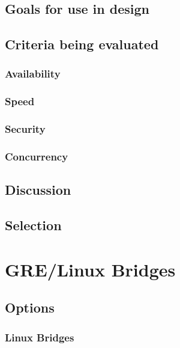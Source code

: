 \documentclass[10pt,letterpaper,onecolumn,draftclsnofoot]{IEEEtran}
\begin{document}
\subsection{Goals for use in design}

\subsection{Criteria being evaluated}

\subsubsection{Availability}

\subsubsection{Speed}

\subsubsection{Security}

\subsubsection{Concurrency}

\subsection{Discussion}


\subsection{Selection}


\section{GRE/Linux Bridges}

\subsection{Options}

\subsubsection{Linux Bridges}

\subsubsection{}
\end{document}
